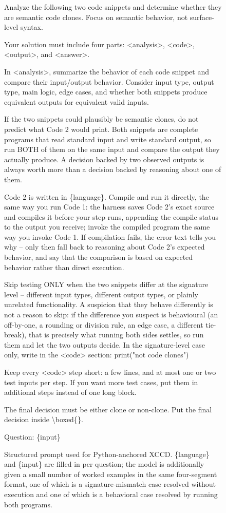 \begin{figure}[t]
\centering
\begin{tcolorbox}[width=0.95\linewidth,
title=\textbf{Prompt for Python-Anchored XCCD}, halign=left]
\ttfamily\small
Analyze the following two code snippets and determine whether they are
semantic code clones. Focus on semantic behavior, not surface-level syntax.

Your solution must include four parts: <analysis>, <code>, <output>, and
<answer>.

In <analysis>, summarize the behavior of each code snippet and compare their
input/output behavior. Consider input type, output type, main logic, edge
cases, and whether both snippets produce equivalent outputs for equivalent
valid inputs.

If the two snippets could plausibly be semantic clones, do not predict what
Code 2 would print. Both snippets are complete programs that read standard
input and write standard output, so run BOTH of them on the same input and
compare the output they actually produce. A decision backed by two observed
outputs is always worth more than a decision backed by reasoning about one of
them.

Code 2 is written in \{language\}. Compile and run it directly, the same way
you run Code 1: the harness saves Code 2's exact source and compiles it
before your step runs, appending the compile status to the output you
receive; invoke the compiled program the same way you invoke Code 1. If
compilation fails, the error text tells you why -- only then fall back to
reasoning about Code 2's expected behavior, and say that the comparison is
based on expected behavior rather than direct execution.

Skip testing ONLY when the two snippets differ at the signature level --
different input types, different output types, or plainly unrelated
functionality. A suspicion that they behave differently is not a reason to
skip: if the difference you suspect is behavioural (an off-by-one, a
rounding or division rule, an edge case, a different tie-break), that is
precisely what running both sides settles, so run them and let the two
outputs decide. In the signature-level case only, write in the <code>
section: print("not code clones")

Keep every <code> step short: a few lines, and at most one or two test
inputs per step. If you want more test cases, put them in additional steps
instead of one long block.

The final decision must be either clone or non-clone. Put the final decision
inside \textbackslash boxed\{\}.

Question: \{input\}
\end{tcolorbox}
\caption{Structured prompt used for Python-anchored XCCD. \{language\} and
\{input\} are filled in per question; the model is additionally given a
small number of worked examples in the same four-segment format, one of
which is a signature-mismatch case resolved without execution and one of
which is a behavioral case resolved by running both programs.}
\Description{}
\label{fig:xccd-prompt}
\end{figure}

